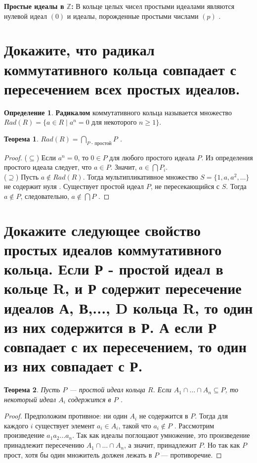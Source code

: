 \documentclass[12pt, a4paper]{article}
\theoremstyle{definition}
\newtheorem{definition}{Определение}[section]
\theoremstyle{plain}
\newtheorem{theorem}{Теорема}[section]
\begin{document}
	\textbf{Простые идеалы в $\mathbb{Z}$:} В кольце целых чисел простыми идеалами являются нулевой идеал $(0)$ и идеалы, порожденные простыми числами $(p)$ .
	
	\newpage
	
	\section{Докажите, что радикал коммутативного кольца совпадает с пересечением всех простых идеалов.}
	
	\begin{definition}
		\textbf{Радикалом} коммутативного кольца называется множество $Rad(R) = \{a \in R \mid a^n=0 \text{ для некоторого } n \ge 1\}$.
	\end{definition}
	
	\begin{theorem}
		$Rad(R) = \bigcap_{P \text{ - простой}} P$ .
	\end{theorem}
	\begin{proof}
		($\subseteq$) Если $a^n=0$, то $0 \in P$ для любого простого идеала $P$. Из определения простого идеала следует, что $a \in P$. Значит, $a \in \bigcap P_i$. \\
		($\supseteq$) Пусть $a \notin Rad(R)$. Тогда мультипликативное множество $S = \{1, a, a^2, \dots\}$ не содержит нуля . Существует простой идеал $P$, не пересекающийся с $S$. Тогда $a \notin P$, следовательно, $a \notin \bigcap P$ .
	\end{proof}
	
	\newpage
	
	\section{Докажите следующее свойство простых идеалов коммутативного кольца. Если Р - простой идеал в кольце R, и Р содержит пересечение идеалов А, В,..., D кольца R, то один из них содержится в Р. А если Р совпадает с их пересечением, то один из них совпадает с Р.}
	
	\begin{theorem}
		Пусть $P$ — простой идеал кольца $R$. Если $A_1 \cap \dots \cap A_n \subseteq P$, то некоторый идеал $A_i$ содержится в $P$ .
	\end{theorem}
	\begin{proof}
		Предположим противное: ни один $A_i$ не содержится в $P$. Тогда для каждого $i$ существует элемент $a_i \in A_i$, такой что $a_i \notin P$ . Рассмотрим произведение $a_1 a_2 \dots a_n$. Так как идеалы поглощают умножение, это произведение принадлежит пересечению $A_1 \cap \dots \cap A_n$, а значит, принадлежит $P$. Но так как $P$ прост, хотя бы один множитель должен лежать в $P$ — противоречие.
	\end{proof}
	
\end{document}
